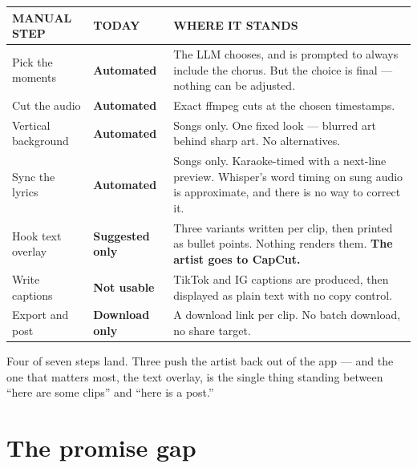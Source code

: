 \documentclass[11pt,a4paper]{article}
\newcommand{\stOK}[1]{\textcolor{okcol}{\sffamily\bfseries\small #1}}
\newcommand{\stNo}[1]{\textcolor{critcol}{\sffamily\bfseries\small #1}}
\newcommand{\stPart}[1]{\textcolor{warncol}{\sffamily\bfseries\small #1}}
\begin{document}
\vspace{8pt}
\begin{tabularx}{\linewidth}{@{}p{3.1cm} l X@{}}
\toprule
{\sffamily\footnotesize\color{muted}MANUAL STEP} &
{\sffamily\footnotesize\color{muted}TODAY} &
{\sffamily\footnotesize\color{muted}WHERE IT STANDS} \\
\midrule
Pick the moments &
\stOK{Automated} &
\small The LLM chooses, and is prompted to always include the chorus. But the
choice is final --- nothing can be adjusted. \\[4pt]

Cut the audio &
\stOK{Automated} &
\small Exact ffmpeg cuts at the chosen timestamps. \\[4pt]

Vertical background &
\stOK{Automated} &
\small Songs only. One fixed look --- blurred art behind sharp art. No
alternatives. \\[4pt]

Sync the lyrics &
\stOK{Automated} &
\small Songs only. Karaoke-timed with a next-line preview. Whisper's word timing
on sung audio is approximate, and there is no way to correct it. \\[4pt]

Hook text overlay &
\stNo{Suggested only} &
\small Three variants written per clip, then printed as bullet points. Nothing
renders them. \textbf{The artist goes to CapCut.} \\[4pt]

Write captions &
\stPart{Not usable} &
\small TikTok and IG captions are produced, then displayed as plain text with no
copy control. \\[4pt]

Export and post &
\stPart{Download only} &
\small A download link per clip. No batch download, no share target. \\
\bottomrule
\end{tabularx}

\vspace{10pt}
Four of seven steps land. Three push the artist back out of the app --- and the
one that matters most, the text overlay, is the single thing standing between
``here are some clips'' and ``here is a post.''

\section{The promise gap}
\end{document}
